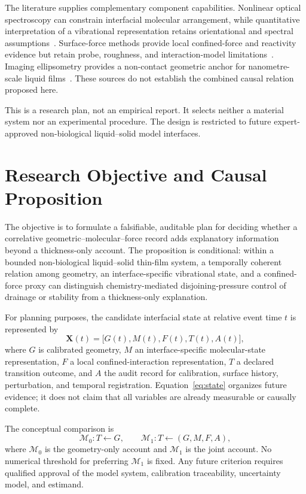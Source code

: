 \documentclass[11pt]{article}
\begin{document}
The literature supplies complementary component capabilities. Nonlinear optical spectroscopy can constrain interfacial molecular arrangement, while quantitative interpretation of a vibrational representation retains orientational and spectral assumptions~\cite{backus2020,wang2005}. Surface-force methods provide local confined-force and reactivity evidence but retain probe, roughness, and interaction-model limitations~\cite{dziadkowiec2019}. Imaging ellipsometry provides a non-contact geometric anchor for nanometre-scale liquid films~\cite{shoji2024}. These sources do not establish the combined causal relation proposed here.

This is a research plan, not an empirical report. It selects neither a material system nor an experimental procedure. The design is restricted to future expert-approved non-biological liquid--solid model interfaces.

\section{Research Objective and Causal Proposition}
The objective is to formulate a falsifiable, auditable plan for deciding whether a correlative geometric--molecular--force record adds explanatory information beyond a thickness-only account. The proposition is conditional: within a bounded non-biological liquid--solid thin-film system, a temporally coherent relation among geometry, an interface-specific vibrational state, and a confined-force proxy can distinguish chemistry-mediated disjoining-pressure control of drainage or stability from a thickness-only explanation.

For planning purposes, the candidate interfacial state at relative event time $t$ is represented by
\begin{equation}
\mathbf{X}(t)=\bigl[G(t),M(t),F(t),T(t),A(t)\bigr],
\label{eq:state}
\end{equation}
where $G$ is calibrated geometry, $M$ an interface-specific molecular-state representation, $F$ a local confined-interaction representation, $T$ a declared transition outcome, and $A$ the audit record for calibration, surface history, perturbation, and temporal registration. Equation~\eqref{eq:state} organizes future evidence; it does not claim that all variables are already measurable or causally complete.

The conceptual comparison is
\begin{equation}
\mathcal{M}_0:T\leftarrow G,\qquad \mathcal{M}_1:T\leftarrow(G,M,F,A),
\label{eq:comparison}
\end{equation}
where $\mathcal{M}_0$ is the geometry-only account and $\mathcal{M}_1$ is the joint account. No numerical threshold for preferring $\mathcal{M}_1$ is fixed. Any future criterion requires qualified approval of the model system, calibration traceability, uncertainty model, and estimand.
\end{document}
